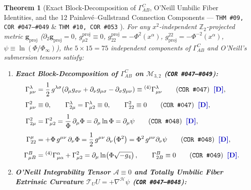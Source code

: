 \documentclass[11pt,a4paper]{article}
\newcommand{\catD}{\text{\textbf{\textcolor{blue!75!black}{[D]}}}}
\theoremstyle{definition}
\theoremstyle{plain}
\newtheorem{theorem}[axiom]{Theorem}
\theoremstyle{remark}
\begin{document}
\begin{theorem}[Exact Block-Decomposition of $\Gamma^C_{AB}$, O'Neill Umbilic Fiber Identities, and the 12 Painlev\'e--Gullstrand Connection Components --- \texttt{THM~\#09, COR~\#047--\#049} \& \texttt{THM~\#10, COR~\#053} \catD]\label{thm:c2_parallel_transport_blocks}
For any $x^2$-independent $\mathbb{Z}_2$-projected metric $\mathbf{g}_{\mathrm{proj}}$ ($\partial_2 \mathbf{g}_{\mathrm{proj}} = 0$, $g_{\mu 2}^{\mathrm{proj}} \equiv 0$, $g_{22}^{\mathrm{proj}} = -\Phi^2(x^\alpha)$, $g^{22}_{\mathrm{proj}} = -\Phi^{-2}(x^\alpha)$, $\psi \equiv \ln(\Phi/\Phi_\infty)$), the $5 \times 15 = 75$ independent components of $\Gamma^C_{AB}$ and O'Neill's submersion tensors satisfy:
\begin{enumerate}[label=(\roman*)]
  \item \textbf{Exact Block-Decomposition of $\Gamma^C_{AB}$ on $\mathcal{M}_{3,2}$ (\texttt{COR~\#047--\#049}):}
  \begin{align}
  \Gamma^\lambda_{\mu\nu} &= \frac{1}{2}\,g^{\lambda\sigma}\!\left(\partial_\mu g_{\sigma\nu} + \partial_\nu g_{\mu\sigma} - \partial_\sigma g_{\mu\nu}\right) \equiv {}^{(4)}\Gamma^\lambda_{\mu\nu} \qquad \textnormal{(\texttt{COR~\#047})} \;\;\catD, \label{eq:c2_gamma_macro} \\[3pt]
  \Gamma^2_{\mu\nu} &\equiv 0, \qquad
  \Gamma^\lambda_{2\mu} = \Gamma^\lambda_{\mu 2} \equiv 0, \qquad
  \Gamma^2_{22} \equiv 0 \qquad \textnormal{(\texttt{COR~\#047})} \;\;\catD, \label{eq:c2_gamma_zeros} \\[3pt]
  \Gamma^2_{2\mu} &= \Gamma^2_{\mu 2} = \frac{1}{\Phi}\,\partial_\mu\Phi = \partial_\mu \ln\Phi = \partial_\mu\psi \qquad \textnormal{(\texttt{COR~\#048})} \;\;\catD, \label{eq:c2_gamma_22mu} \\[3pt]
  \Gamma^\mu_{22} &= +\Phi\,g^{\mu\nu}\,\partial_\nu\Phi = \frac{1}{2}\,g^{\mu\nu}\,\partial_\nu\!\left(\Phi^2\right) = \Phi^2\,g^{\mu\nu}\partial_\nu\psi \qquad \textnormal{(\texttt{COR~\#048})} \;\;\catD, \label{eq:c2_gamma_mu22} \\[3pt]
  \Gamma^B_{\mu B} &= {}^{(4)}\Gamma^\alpha_{\mu\alpha} + \Gamma^2_{\mu 2} = \partial_\mu\ln\!\left(\Phi\sqrt{-g_4}\right), \qquad
  \Gamma^B_{2B} \equiv 0 \qquad \textnormal{(\texttt{COR~\#049})} \;\;\catD. \label{eq:c2_gamma_trace}
  \end{align}
  \item \textbf{O'Neill Integrability Tensor $\mathcal{A} \equiv 0$ and Totally Umbilic Fiber Extrinsic Curvature $\mathcal{T}_U U = +\nabla^{\mathcal{H}}\psi$ (\texttt{COR~\#047--\#048}):}

\end{enumerate}
\end{theorem}
\end{document}
